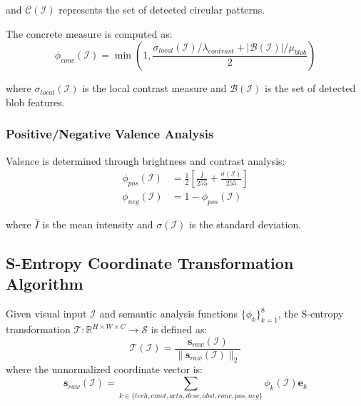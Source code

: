 and $\mathcal{C}(\mathcal{I})$ represents the set of detected circular patterns.

The concrete measure is computed as:
\begin{equation}
\phi_{conc}(\mathcal{I}) = \min\left(1, \frac{\sigma_{local}(\mathcal{I})/\lambda_{contrast} + |\mathcal{B}(\mathcal{I})|/\mu_{blob}}{2}\right)
\label{eq:concrete-measure}
\end{equation}

where $\sigma_{local}(\mathcal{I})$ is the local contrast measure and $\mathcal{B}(\mathcal{I})$ is the set of detected blob features.

\subsubsection{Positive/Negative Valence Analysis}

Valence is determined through brightness and contrast analysis:
\begin{align}
\phi_{pos}(\mathcal{I}) &= \frac{1}{2}\left[\frac{\bar{I}}{255} + \frac{\sigma(\mathcal{I})}{255}\right] \label{eq:positive-measure} \\
\phi_{neg}(\mathcal{I}) &= 1 - \phi_{pos}(\mathcal{I}) \label{eq:negative-measure}
\end{align}

where $\bar{I}$ is the mean intensity and $\sigma(\mathcal{I})$ is the standard deviation.

\subsection{S-Entropy Coordinate Transformation Algorithm}

\begin{definition}
Given visual input $\mathcal{I}$ and semantic analysis functions $\{\phi_k\}_{k=1}^8$, the S-entropy transformation $\mathcal{T}: \mathbb{R}^{H \times W \times C} \to \mathcal{S}$ is defined as:
\begin{equation}
\mathcal{T}(\mathcal{I}) = \frac{\mathbf{s}_{raw}(\mathcal{I})}{\|\mathbf{s}_{raw}(\mathcal{I})\|_2}
\label{eq:s-entropy-transform}
\end{equation}
where the unnormalized coordinate vector is:
\begin{equation}
\mathbf{s}_{raw}(\mathcal{I}) = \sum_{k \in \{tech,emot,actn,desc,abst,conc,pos,neg\}} \phi_k(\mathcal{I}) \mathbf{e}_k
\label{eq:raw-coordinate}
\end{equation}
\end{definition}

